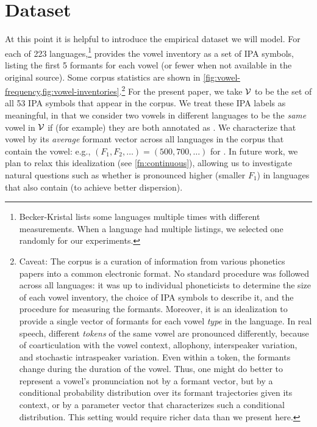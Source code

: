 \documentclass[11pt,a4paper]{article}
\renewcommand{\newcite}[2][]{\citet[#1]{#2}}
\newcommand{\phone}[1]{\textipa{[#1]}}
\begin{document}
\section{Dataset}

At this point it is helpful to introduce the empirical dataset we will
model.  For each of 223 languages,\footnote{Becker-Kristal lists some languages multiple times with different measurements.  When a language had multiple listings, we selected one randomly for our experiments.} \newcite{becker2010acoustic} provides the vowel inventory as a 
set of IPA symbols, listing the first 5 formants for each vowel
(or fewer when not available in the original source).
Some corpus statistics are shown in
\cref{fig:vowel-frequency,fig:vowel-inventories}.\footnote{\label{fn:ipa}Caveat: The
  corpus is a curation of information from various phonetics papers
  into a common electronic format.  No standard procedure was followed
  across all languages: it was up to individual phoneticists to
  determine the size of each vowel inventory, the choice of IPA
  symbols to describe it, and the procedure for measuring the
  formants.  Moreover, it is an idealization to provide a single
  vector of formants for each vowel {\em type} in the language.  In real
  speech, different {\em tokens} of the same vowel are pronounced
  differently, because of coarticulation with the vowel context,
  allophony, interspeaker variation, and stochastic intraspeaker
  variation.  Even within a token, the formants change during the
  duration of the vowel.  Thus, one might do better to represent a
  vowel's pronunciation not by a formant vector, but by a conditional
  probability distribution over its formant trajectories given its
  context, or by a parameter vector that characterizes such a
  conditional distribution.  This setting would require richer data
than we present here.}
For the present paper, we take $\cal V$ to be the set of all 53 IPA
symbols that appear in the corpus.  We treat these IPA labels as
meaningful, in that we consider two vowels in different languages to
be the {\em same} vowel in $\cal V$ if (for example) they are both
annotated as \phone{O}.  We characterize that vowel by its {\em
  average} formant vector across all languages in the corpus that
contain the vowel: e.g., $(F_1, F_2, \ldots) = (500, 700, \ldots)$ for
\phone{O}.  In future work, we plan to relax this idealization (see
\cref{fn:continuous}), allowing us to investigate natural questions
such as whether \phone{u} is pronounced higher (smaller $F_1$) in
languages that also contain \phone{o} (to achieve better dispersion).
\end{document}
